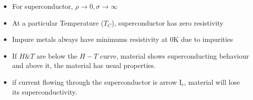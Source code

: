 \documentclass[12pt, a4paper]{article}
\begin{document}
\vspace{1cm}
\noparindent


\begin{minipage}[t][][b]{.67\textwidth}%
	\begin{itemize}
		\item For superconductor, $\rho \rightarrow 0, \sigma \rightarrow \infty$
		\item At a particular Temperature (${T_C}$), superconductor has zero resistivity
		\item Impure metals always have minimums resistivity at 0K due to impurities
		\item If $H \& T$ are below the $H-T$ curve, material shows superconducting behaviour and above it, the material has usual properties.
		\item if current flowing through the superconductor is arrow I$_c$, material will lose its superconductivity.\\
		      \medskip \\
		      \\
	\end{itemize}
\end{minipage}%
\hfill
\end{document}

